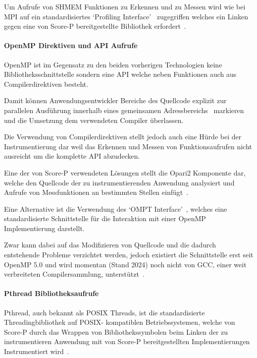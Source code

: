 \documentclass[german,proseminar,hyperref,utf8,lof]{zihpub}
\begin{document}
    Um Aufrufe von SHMEM Funktionen zu Erkennen und zu Messen wird wie bei MPI auf ein standardisiertes
    `Profiling Interface'~ zugegriffen welches ein Linken gegen eine von
    Score-P bereitgestellte Bibliothek erfordert~.

    \paragraph{OpenMP Direktiven und API Aufrufe}
    OpenMP ist im Gegensatz zu den beiden vorherigen Technologien keine Bibliotheksschnittstelle
    sondern eine API welche neben Funktionen auch aus Compilerdirektiven besteht.

    Damit können Anwendungsentwickler Bereiche des Quellcode explizit zur parallelen Ausführung
    innerhalb eines gemeinsamen Adressbereichs~ markieren und die Umsetzung 
    dem verwendeten Compiler überlassen.

    Die Verwendung von Compilerdirektiven stellt jedoch auch eine Hürde bei der Instrumentierung dar
    weil das Erkennen und Messen von Funktionsaufrufen nicht ausreicht um die komplette API abzudecken.

    Eine der von Score-P verwendeten Lösungen stellt die Opari2 Komponente dar, welche den Quellcode der
    zu instrumentierenden Anwendung analysiert und Aufrufe von Messfunktionen an bestimmten Stellen
    einfügt~.

    Eine Alternative ist die Verwendung des `OMPT Interface'~, welches eine
    standardisierte Schnittstelle für die Interaktion mit einer OpenMP Implementierung darstellt.

    Zwar kann dabei auf das Modifizieren von Quellcode und die dadurch entstehende Probleme verzichtet werden,
    jedoch existiert die Schnittstelle erst seit OpenMP 5.0 und wird momentan (Stand 2024) noch nicht von
    GCC, einer weit verbreiteten Compilersammlung, unterstützt~\cite{gomp}. 

    \paragraph{Pthread Bibliotheksaufrufe}
    Pthread, auch bekannt als POSIX Threads, ist die standardisierte Threadingbibliothek auf POSIX-
    kompatiblen Betriebssystemen, welche von Score-P durch das Wrappen von Bibliothekssymbolen
    beim Linken der zu instrumentieren Anwendung mit von Score-P bereitgestellten
    Implementierungen Instrumentiert wird~.
\end{document}
